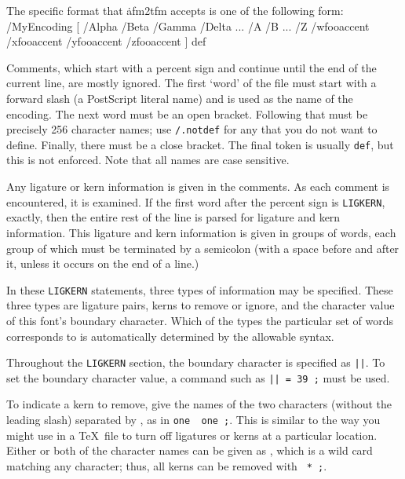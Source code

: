 The specific format that \.{afm2tfm} accepts is one of the following
form:
{\vskip0pt\parskip=0pt
/MyEncoding [ /Alpha /Beta /Gamma /Delta ...
     /A /B ... /Z %
     /wfooaccent /xfooaccent /yfooaccent /zfooaccent ] def
\endverb}

Comments, which start with a percent sign and continue until the
end of the current line, are mostly ignored.  The first `word' of
the file must start with a forward slash (a PostScript literal
name) and is used as the name of the encoding.  The next word must
be an open bracket.  Following that must be precisely 256 character
names; use {\tt /.notdef} for any that you do not want to define.
Finally, there must be a close bracket.  The final token is usually
{\tt def}, but this is not enforced.  Note that all names are
case sensitive.

Any ligature or kern information is given in the comments.  As each
comment is encountered, it is examined.  If the first word after the
percent sign is {\tt LIGKERN}, exactly, then the entire rest of the
line is parsed for ligature and kern information.  This ligature and
kern information is given in groups of words, each group of which must
be terminated by a semicolon (with a space before and after it, unless
it occurs on the end of a line.)

In these {\tt LIGKERN} statements, three types of information may be
specified.  These three types are ligature pairs, kerns to remove or
ignore, and the character value of this font's boundary character.
Which of the types the particular set of words corresponds to is
automatically determined by the allowable syntax.

Throughout the {\tt LIGKERN} section, the boundary character is
specified as {\tt ||}.
To set the boundary character value, a command such as
{\tt || = 39 ;} must be used.

To indicate a kern to remove, give the names of the two characters
(without the leading slash) separated by {\tt {}}, as in
{\tt one \ one ;}.  This is similar to the way you
might use {\tt {}} in a \TeX\ file to turn off ligatures
or kerns at a particular location.  Either or both of the character
names can be given as {\tt *}, which is a wild card matching any
character; thus, all kerns can be removed with {\tt *
\ * ;}.

